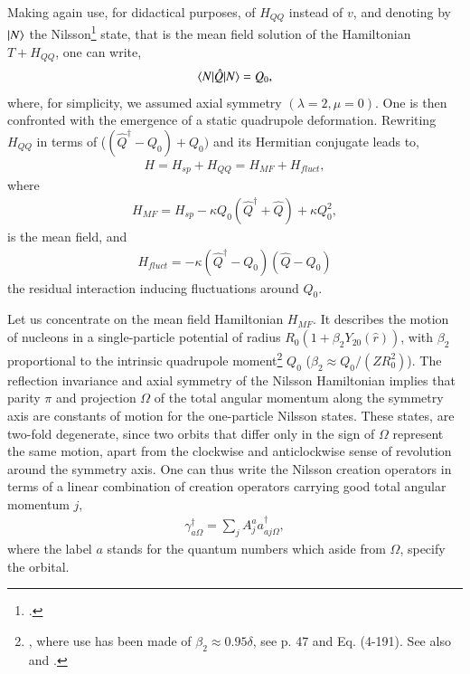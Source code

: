 Making again use, for didactical purposes, of $H_{QQ}$ instead of $v$, and denoting by $|{N} \rangle$ the  Nilsson\footnote{\cite{Nilsson:55}.} state, that is the  mean field solution of the Hamiltonian $T+H_{QQ}$, one can write,
  \begin{align}\label{eq0.4.1}
\langle {N|\hat Q|N} \rangle=Q_0,
  \end{align}
where, for simplicity, we assumed axial symmetry $(\lambda=2,\mu=0)$. One is then confronted with the  emergence of a static quadrupole deformation.
Rewriting $H_{QQ}$ in terms of ($(\hat Q^\dagger-Q_0)+Q_0)$ and its Hermitian conjugate leads to,  
  \begin{align}\label{eq0.4.2}
H=H_{sp}+H_{QQ}=H_{MF}+H_{fluct},
\end{align}
where 
  \begin{align}\label{eq0.4.3}
H_{MF}=H_{sp}-\kappa Q_0(\hat Q^\dagger+\hat Q)+\kappa Q_0^2,
\end{align}
is the mean field, and
\begin{align}\label{eq0.4.4}
H_{fluct}=-\kappa(\hat Q^\dagger-Q_0)(\hat Q-Q_0)
\end{align}
the residual interaction inducing fluctuations around $Q_0$.


 Let us  concentrate on the mean field Hamiltonian $H_{MF}$. It describes the motion of nucleons in a single-particle potential of radius $R_0(1+\beta_2Y_{20}(\hat r))$, with $\beta_2$ proportional to the intrinsic quadrupole moment\footnote{\cite{Mottelson:59}, where use has been made of $\beta_2\approx0.95\delta$, see \cite{Bohr:75} p. 47 and Eq. (4-191). See also \cite{Nilsson:55} and \cite{Ragnarsson:05}.} $Q_0$ ($\beta_2\approx Q_0/(ZR_0^2)$). The reflection invariance and axial symmetry of the Nilsson Hamiltonian implies that parity $\pi$ and projection $\Omega$ of the total angular momentum along the symmetry axis are constants of motion for the one-particle Nilsson states. These states, are two-fold degenerate, since two orbits that differ only in the sign of $\Omega$ represent the same motion, apart from the clockwise and anticlockwise sense of revolution around the symmetry axis. One can thus write the Nilsson creation operators in terms of a linear combination of creation operators carrying good total angular momentum $j$, 
\begin{align}\label{eq0.4.5}
\gamma^\dagger_{a\Omega}=\sum_jA_j^aa^\dagger_{aj\Omega},
\end{align}
where the label $a$ stands for  the quantum numbers which aside from $\Omega$, specify the orbital. 

